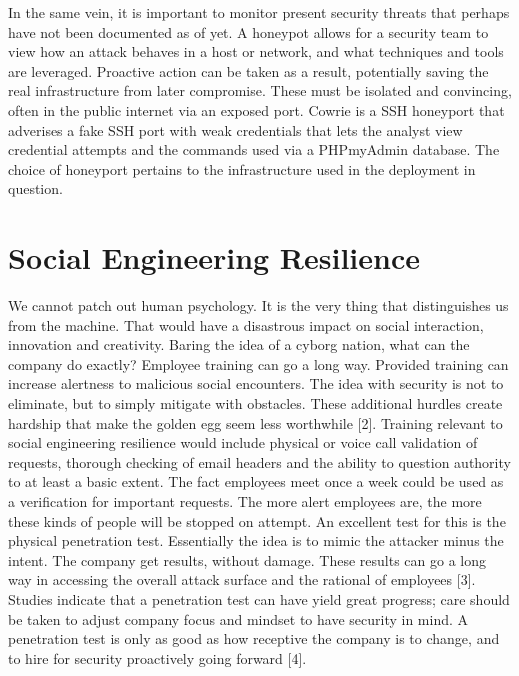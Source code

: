 In the same vein, it is important to monitor present security threats that perhaps have not been documented as of yet. A honeypot allows for a security team to view how an attack behaves in a host or network, and what techniques and tools are leveraged. Proactive action can be taken as a result, potentially saving the real infrastructure
from later compromise. These must be isolated and convincing, often in the public internet via an exposed port. Cowrie is a SSH honeyport that adverises a fake SSH port with weak credentials that lets the analyst view credential attempts and the commands used via a PHPmyAdmin database. The choice of honeyport pertains to the infrastructure used in the deployment in question.

\section {Social Engineering Resilience}
We cannot patch out human psychology. It is the very thing that distinguishes us from the machine. That would have a disastrous impact on social interaction, innovation and creativity. Baring the idea of a cyborg nation, what can the company do exactly? 
Employee training can go a long way. Provided training can increase alertness to malicious social encounters. The idea with security is not to eliminate, but to simply mitigate with obstacles. These additional hurdles create hardship that make the golden egg seem less worthwhile [2].
Training relevant to social engineering resilience would include physical or voice call validation of requests, thorough checking of email headers and the ability to question authority to at least a basic extent. The fact employees meet once a week could be used as a verification for important requests.
The more alert employees are, the more these kinds of people will be stopped on attempt. An excellent test for this is the physical penetration test. Essentially the idea is to mimic the attacker minus the intent. The company get results, without damage. These results can go a long way in accessing the overall attack surface and the rational of employees [3]. Studies indicate that a penetration test can have yield great progress; care should be taken to adjust company focus and mindset to have security in mind. A penetration test is only as good as how receptive the company is to change, and to hire for security proactively going forward [4].




